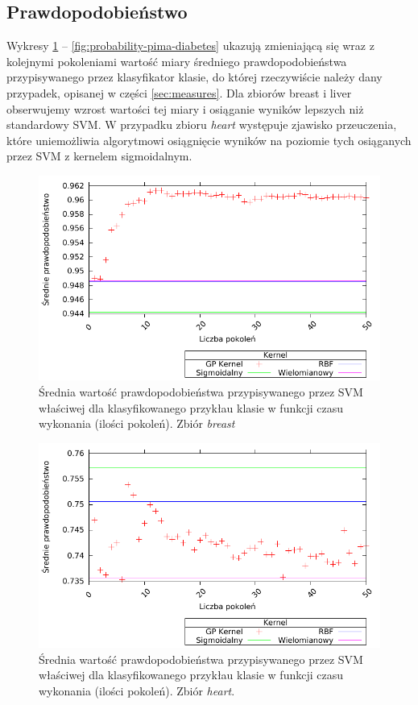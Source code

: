 \FloatBarrier
\subsection{Prawdopodobieństwo}
Wykresy \ref{fig:probability-breast} -- \ref{fig:probability-pima-diabetes} ukazują zmieniającą się wraz z kolejnymi pokoleniami wartość miary średniego prawdopodobieństwa przypisywanego przez klasyfikator klasie, do której rzeczywiście należy dany przypadek, opisanej w części \ref{sec:measures}. Dla zbiorów breast i liver obserwujemy wzrost wartości tej miary i osiąganie wyników lepszych niż standardowy SVM. W przypadku zbioru \emph{heart} występuje zjawisko przeuczenia, które uniemożliwia algorytmowi osiągnięcie wyników na poziomie tych osiąganych przez SVM z kernelem sigmoidalnym.

	\begin{figure}
		\includegraphics[scale=0.90]{figures/results/probability/probability-breast}
		\caption{Średnia wartość prawdopodobieństwa przypisywanego przez SVM właściwej dla klasyfikowanego przykłau klasie w funkcji czasu wykonania (ilości pokoleń). Zbiór \emph{breast}\label{fig:probability-breast}}
	\end{figure}
	
	\begin{figure}
		\includegraphics[scale=0.90]{figures/results/probability/probability-heart}
		\caption{Średnia wartość prawdopodobieństwa przypisywanego przez SVM właściwej dla klasyfikowanego przykłau klasie w funkcji czasu wykonania (ilości pokoleń). Zbiór \emph{heart}.\label{fig:probability-heart}}
	\end{figure}
	
